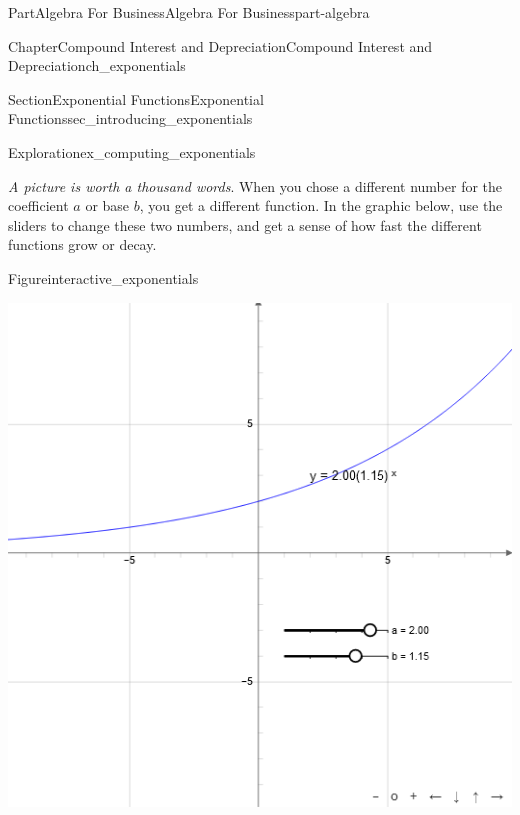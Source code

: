 \documentclass{tufte-book}
\numberwithin{equation}{chapter}
\begin{document}
\begin{partptx}{Part}{Algebra For Business}{}{Algebra For Business}{}{}{part-algebra}
\begin{chapterptx}{Chapter}{Compound Interest and Depreciation}{}{Compound Interest and Depreciation}{}{}{ch_exponentials}
\begin{sectionptx}{Section}{Exponential Functions}{}{Exponential Functions}{}{}{sec_introducing_exponentials}
\begin{exploration}{Exploration}{}{ex_computing_exponentials}
\begin{enumerate}[font=\bfseries,label=(\alph*),ref=\alph*]
\begin{image}{0.25}{0.5}{0.25}{}
{\begin{tikzpicture}
\end{tikzpicture}
}%
\end{image}%
\end{enumerate}%
\end{exploration}%
\emph{A picture is worth a thousand words}. When you chose a different number for the coefficient \(a\) or base \(b\), you get a different function.  In the graphic below, use the sliders to change these two numbers, and get a sense of how fast the different functions grow or decay.%
\begin{figureptx}{Figure}{}{interactive_exponentials}{}%
\begin{sidebyside}{2}{0.075}{0.075}{0.17}%
\begin{sbspanel}{0.47}%
\includegraphics[width=\linewidth]{external/jsxgraph-algebra-general-exponential.png}
\end{sbspanel}%
\begin{sbspanel}{0.21}%

\end{sbspanel}
\end{sidebyside}
\end{figureptx}
\end{sectionptx}
\end{chapterptx}
\end{partptx}
\end{document}
